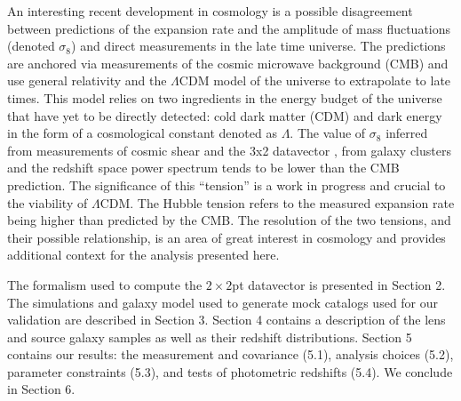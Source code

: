 \documentclass[fleqn,usenatbib]{mnras}
\newcommand{\blue}[1]{\textcolor{blue}{#1}}
\begin{document}
An interesting recent development in cosmology is a possible disagreement between predictions of the expansion rate and the amplitude of mass fluctuations (denoted $\sigma_8$) and direct measurements in the late time universe. The predictions are anchored via measurements of the cosmic microwave background (CMB) and use general relativity and the $\Lambda$CDM model of the universe to extrapolate to late times. This model relies on two ingredients in the energy budget of the universe that have yet to be directly detected: cold dark matter (CDM) and dark energy in the form of a cosmological constant denoted as $\Lambda$. The value of $\sigma_8$ inferred from measurements of cosmic shear and the 3x2 datavector \citep{Abbott_2018,Troxel_2018, Heymans_2021, Hikage_2019, y3-3x2ptkp, y3-cosmicshear1, y3-cosmicshear2}, from galaxy clusters \citep{Abbott_2020_clusters,To_2021} and the redshift space power spectrum \citep{Philcox_2020} tends to be lower than the CMB prediction. The significance of this ``tension''  is a work in progress and crucial to the viability of $\Lambda$CDM. The Hubble tension refers to the measured expansion rate being higher than predicted by the CMB. The resolution of the two tensions, and their possible relationship, is an area of great interest in cosmology and provides additional context for the analysis presented here. 





The formalism used to compute the $2\times2$pt datavector is presented in Section 2. The simulations and galaxy model used to generate mock catalogs used for our validation are described in Section 3.  Section 4 contains a description of the lens and source galaxy samples as well as their redshift distributions. Section 5 contains our results: the measurement and covariance (5.1), analysis choices (5.2), parameter constraints (5.3), and tests of photometric redshifts (5.4). We conclude in Section 6.  
\end{document}

